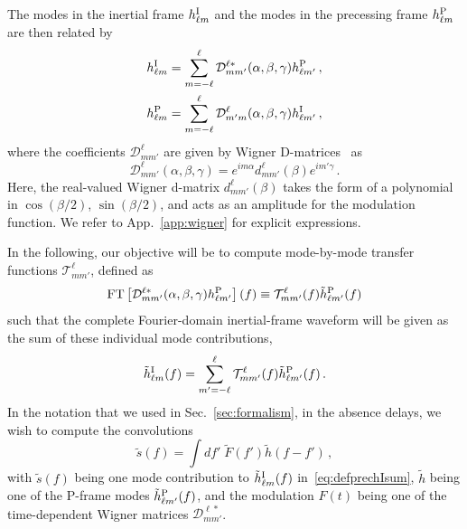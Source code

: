 \documentclass[aps,showpacs,twocolumn,
prd,superscriptaddress,nofootinbib]{revtex4-1}
\newcommand{\be}{\begin{equation}}
\newcommand{\ee}{\end{equation}}
\newcommand\calT{{\mathcal{T}}}
\newcommand\calD{{\mathcal{D}}}
\newcommand{\jgb}[1]{{\color{DarkGreen} #1}}
\begin{document}
The modes in the inertial frame $h_{\ell m}^{\rm I}$ and the modes in the precessing frame $h_{\ell m}^{\rm P}$ are then related by~\cite{Goldberg+67}
\begin{subequations}
\label{eq:wignerrot}
\begin{align}
	h_{\ell m}^{\rm I} = \sum\limits_{m=-\ell}^{\ell} \calD^{\ell *}_{mm'} (\alpha,\beta,\gamma) h_{\ell m'}^{\rm P} \,, \\
	h_{\ell m}^{\rm P} = \sum\limits_{m=-\ell}^{\ell} \calD^{\ell }_{m'm} (\alpha,\beta,\gamma) h_{\ell m'}^{\rm I} \,,
\end{align}
\end{subequations}
where the coefficients $\calD^{\ell}_{mm'}$ are given by Wigner D-matrices~\cite{Wigner59} as
\be\label{eq:defWignerD}
	\calD^{\ell}_{mm'} (\alpha, \beta, \gamma) = e^{im \alpha} d^{\ell}_{mm'}(\beta) e^{im' \gamma}\,.
\ee
Here, the \jgb{real-valued} Wigner d-matrix $d^{\ell}_{mm'}(\beta)$ takes the form of a polynomial in $\cos (\beta/2)$, $\sin (\beta/2)$, and acts as an amplitude for the modulation function. We refer to App.~\ref{app:wigner} for explicit expressions.

In the following, our objective will be to compute mode-by-mode transfer functions $\calT^{\ell}_{mm'}$, defined as
\be\label{eq:defprectransfer}
	\mathrm{FT} \left[ \calD^{\ell *}_{mm'} (\alpha,\beta,\gamma) h_{\ell m'}^{\rm P} \right] (f) \equiv \calT^{\ell}_{mm'}(f) \tilde{h}_{\ell m'}^{\rm P} (f)
\ee
such that the complete Fourier-domain inertial-frame waveform will be given as the sum of these individual mode contributions,
\be\label{eq:defprechIsum}
	\tilde{h}_{\ell m}^{\rm I} (f) = \sum\limits_{m'=-\ell}^{\ell} \calT^{\ell}_{mm'}(f) \tilde{h}_{\ell m'}^{\rm P} (f) \,.
\ee
In the notation that we used in Sec.~\ref{sec:formalism}, in the absence delays, we wish to compute the convolutions
\be\label{eq:precconvolution}
	\tilde{s} (f) = \int df' \; \tilde{F}(f') \tilde{h} (f-f') \,,
\ee
with $\tilde{s}(f)$ being one mode contribution to $\tilde{h}_{\ell m}^{\rm I} (f)$ in~\eqref{eq:defprechIsum}, $\tilde{h}$ being one of the P-frame modes $\tilde{h}_{\ell m'}^{\rm P} (f)$, and the modulation $F(t)$ being one of the time-dependent Wigner matrices $\calD^{\ell *}_{mm'}$.
\end{document}
